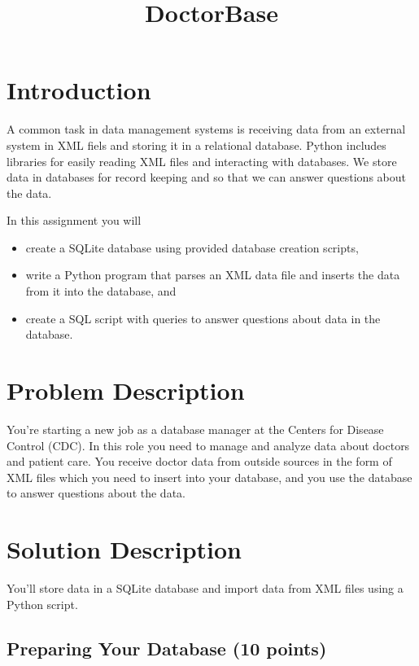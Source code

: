\documentclass[12pt]{article}
\title{DoctorBase}
\author{}
\date{}
\begin{document}
\maketitle
\vspace{-1in}
\section{Introduction}

A common task in data management systems is receiving data from an external system in XML fiels and storing it in a relational database. Python includes libraries for easily reading XML files and interacting with databases. We store data in databases for record keeping and so that we can answer questions about the data.

In this assignment you will
\begin{itemize}
\itemsep0em
\item create a SQLite database using provided database creation scripts,
\item write a Python program that parses an XML data file and inserts the data from it into the database, and
\item create a SQL script with queries to answer questions about data in the database.
\end{itemize}

\section{Problem Description}

You're starting a new job as a database manager at the Centers for Disease Control (CDC). In this role you need to manage and analyze data about doctors and patient care. You receive doctor data from outside sources in the form of XML files which you need to insert into your database, and you use the database to answer questions about the data.

\section{Solution Description}

You'll store data in a SQLite database and import data from XML files using a Python script.

\subsection{Preparing Your Database (10 points)}
\end{document}
